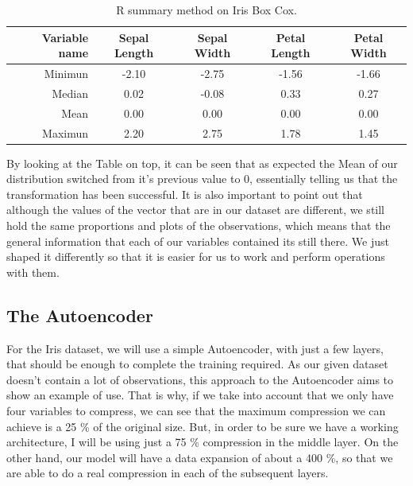\begin{table}[H]
		\caption{R summary method on Iris Box Cox.}
	\begin{center}
	\label{tab:table_Iris_Boxcox}
		\begin{tabular}{r|c|c|c|c} %
			\textbf{Variable name} & \textbf{Sepal Length} & \textbf{Sepal Width} & \textbf{Petal Length} & \textbf{Petal Width}\\
			\hline
			Minimun & -2.10 & -2.75 & -1.56 & -1.66\\
			Median & 0.02 & -0.08 & 0.33 & 0.27\\
			Mean & 0.00 & 0.00 & 0.00 & 0.00\\
			Maximun & 2.20 & 2.75 & 1.78 & 1.45\\
		\end{tabular}
	\end{center}
\end{table}

By looking at the Table on top, it can be seen that as expected the Mean of our distribution switched from it's previous value to 0, essentially telling us that the transformation has been successful. It is also important to point out that although the values of the vector that are in our dataset are different, we still hold the same proportions and plots of the observations, which means that the general information that each of our variables contained its still there. We just shaped it differently so that it is easier for us to work and perform operations with them.

\subsection{The Autoencoder}

For the Iris dataset, we will use a simple Autoencoder, with just a few layers, that should be enough to complete the training required. As our given dataset doesn't contain a lot of observations, this approach to the Autoencoder aims to show an example of use. That is why, if we take into account that we only have four variables to compress, we can see that the maximum compression we can achieve is a 25 \% of the original size. But, in order to be sure we have a working architecture, I will be using just a 75 \% compression in the middle layer. On the other hand, our model will have a data expansion of about a 400 \%, so that we are able to do a real compression in each of the subsequent layers. \par

